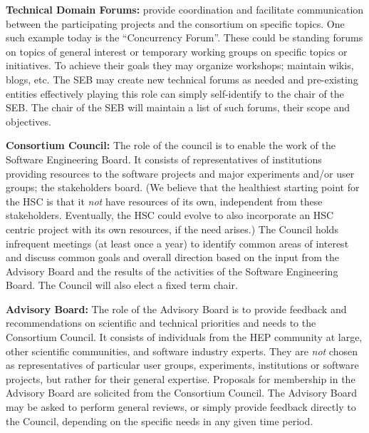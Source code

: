 \documentclass[12pt,letterpaper,fleqn]{article}
\begin{document}
{\bf Technical Domain Forums:} provide coordination and facilitate
communication between the participating projects and the consortium
on specific topics. One such example today is the ``Concurrency Forum''.
These could be standing forums on topics of general interest or
temporary working groups on specific topics or initiatives.
To achieve their goals they may organize workshops; maintain wikis,
blogs, etc. The SEB may create new technical forums as needed and pre-existing entities effectively playing this role can simply self-identify
to the chair of the SEB. The chair of the SEB will maintain a list
of such forums, their scope and objectives.

{\bf Consortium Council:} The role of the council is to enable the
work of the Software Engineering Board.
It consists of representatives of
institutions providing resources to the software projects
and major experiments and/or user groups; the stakeholders board.
(We believe that the healthiest starting point
for the HSC is that it {\em not} have resources of its own, independent
from these stakeholders.  Eventually,
the HSC could evolve to also incorporate an HSC centric project with its own resources, if the need arises.)  
The Council holds infrequent meetings (at least once a year) to 
identify common areas of interest and discuss common goals and overall
direction based on the input from the Advisory Board and the results of the activities of the Software Engineering Board. The Council will
also elect a fixed term chair. 

{\bf Advisory Board:} The role of the Advisory Board is to provide
feedback and recommendations on scientific and technical priorities
and needs to the Consortium Council. It consists of individuals from
the HEP community at large, other scientific communities, and
software industry experts. They are {\em not} chosen as representatives
of particular user groups, experiments, institutions or software
projects, but rather for their general expertise.
Proposals for membership in the Advisory Board are solicited from the Consortium Council. The Advisory Board may be asked to perform general
reviews, or simply provide feedback directly to the Council, depending
on the specific needs in any given time period. 
\end{document}
